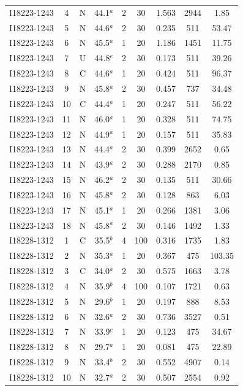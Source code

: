 \begin{table}
\begin{tabular}{ccccccccc}
I18223-1243 & 4 & N & 44.1$^{a}$ & 2 & 30 & 1.563 & 2944 & 1.85 \\
I18223-1243 & 5 & N & 44.6$^{a}$ & 2 & 30 & 0.235 & 511 & 53.47 \\
I18223-1243 & 6 & N & 45.5$^{a}$ & 1 & 20 & 1.186 & 1451 & 11.75 \\
I18223-1243 & 7 & U & 44.8$^{e}$ & 2 & 30 & 0.173 & 511 & 39.26 \\
I18223-1243 & 8 & C & 44.6$^{a}$ & 1 & 20 & 0.424 & 511 & 96.37 \\
I18223-1243 & 9 & N & 45.8$^{a}$ & 2 & 30 & 0.457 & 737 & 34.48 \\
I18223-1243 & 10 & C & 44.4$^{a}$ & 1 & 20 & 0.247 & 511 & 56.22 \\
I18223-1243 & 11 & N & 46.0$^{a}$ & 1 & 20 & 0.328 & 511 & 74.75 \\
I18223-1243 & 12 & N & 44.9$^{a}$ & 1 & 20 & 0.157 & 511 & 35.83 \\
I18223-1243 & 13 & N & 44.4$^{a}$ & 2 & 30 & 0.399 & 2652 & 0.65 \\
I18223-1243 & 14 & N & 43.9$^{a}$ & 2 & 30 & 0.288 & 2170 & 0.85 \\
I18223-1243 & 15 & N & 46.2$^{a}$ & 2 & 30 & 0.135 & 511 & 30.66 \\
I18223-1243 & 16 & N & 45.8$^{a}$ & 2 & 30 & 0.128 & 863 & 6.03 \\
I18223-1243 & 17 & N & 45.1$^{a}$ & 1 & 20 & 0.266 & 1381 & 3.06 \\
I18223-1243 & 18 & N & 45.8$^{a}$ & 2 & 30 & 0.146 & 1492 & 1.33 \\
I18228-1312 & 1 & C & 35.5$^{b}$ & 4 & 100 & 0.316 & 1735 & 1.83 \\
I18228-1312 & 2 & N & 35.3$^{a}$ & 1 & 20 & 0.367 & 475 & 103.35 \\
I18228-1312 & 3 & C & 34.0$^{a}$ & 2 & 30 & 0.575 & 1663 & 3.78 \\
I18228-1312 & 4 & N & 35.9$^{b}$ & 4 & 100 & 0.107 & 1721 & 0.63 \\
I18228-1312 & 5 & N & 29.6$^{b}$ & 1 & 20 & 0.197 & 888 & 8.53 \\
I18228-1312 & 6 & N & 32.6$^{a}$ & 2 & 30 & 0.736 & 3527 & 0.51 \\
I18228-1312 & 7 & N & 33.9$^{c}$ & 1 & 20 & 0.123 & 475 & 34.67 \\
I18228-1312 & 8 & N & 29.7$^{a}$ & 1 & 20 & 0.081 & 475 & 22.89 \\
I18228-1312 & 9 & N & 33.4$^{b}$ & 2 & 30 & 0.552 & 4907 & 0.14 \\
I18228-1312 & 10 & N & 32.7$^{a}$ & 2 & 30 & 0.507 & 2554 & 0.92 \\

\end{tabular}
\end{table}
